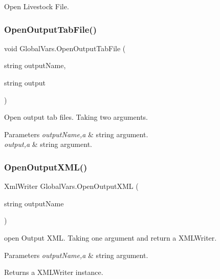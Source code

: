 Open Livestock File. 

\mbox{\label{class_global_vars_a3d95bee07269860dc17a738aa02722f1}} 
\subsubsection{\texorpdfstring{OpenOutputTabFile()}{OpenOutputTabFile()}}
{\footnotesize\ttfamily void Global\+Vars.\+Open\+Output\+Tab\+File (\begin{DoxyParamCaption}\item[{string}]{output\+Name,  }\item[{string}]{output }\end{DoxyParamCaption})\hspace{0.3cm}{\ttfamily [inline]}}



Open output tab files. Taking two arguments. 


\begin{DoxyParams}{Parameters}
{\em output\+Name,a} & string argument. \\
\hline
{\em output,a} & string argument. \\
\hline
\end{DoxyParams}
\mbox{\label{class_global_vars_a7391bb9604228a9d2a281cb33f77961e}} 
\subsubsection{\texorpdfstring{OpenOutputXML()}{OpenOutputXML()}}
{\footnotesize\ttfamily Xml\+Writer Global\+Vars.\+Open\+Output\+X\+ML (\begin{DoxyParamCaption}\item[{string}]{output\+Name }\end{DoxyParamCaption})\hspace{0.3cm}{\ttfamily [inline]}}



open Output X\+ML. Taking one argument and return a X\+M\+L\+Writer. 


\begin{DoxyParams}{Parameters}
{\em output\+Name,a} & string argument. \\
\hline
\end{DoxyParams}
\begin{DoxyReturn}{Returns}
a X\+M\+L\+Writer instance. 
\end{DoxyReturn}
\mbox{\label{class_global_vars_ae0867ba6d6225f173f8394a20925cbdf}} 
